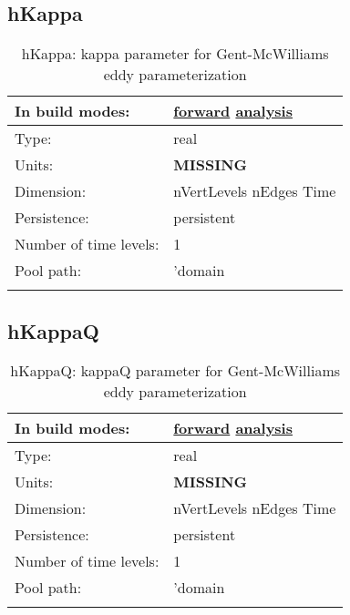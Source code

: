 \subsection[hKappa]{hKappa}
\label{subsec:var_sec_diagnostics_hKappa}
\begin{center}
\begin{longtable}{| p{2.0in} | p{4.0in} |}
        \hline 
        In build modes: & \hyperref[subsec:forward_var_tab_diagnostics]{forward} \hyperref[subsec:analysis_var_tab_diagnostics]{analysis} \\
        \hline 
        Type: & real \\
        \hline 
        Units: & {\bf \color{red} MISSING} \\
        \hline 
        Dimension: & nVertLevels nEdges Time \\
        \hline 
        Persistence: & persistent \\
        \hline 
        Number of time levels: & 1 \\
        \hline 
            Pool path: & 'domain %
 \\
		 \hline 
    \caption{hKappa: kappa parameter for Gent-McWilliams eddy parameterization}
\end{longtable}
\end{center}
\subsection[hKappaQ]{hKappaQ}
\label{subsec:var_sec_diagnostics_hKappaQ}
\begin{center}
\begin{longtable}{| p{2.0in} | p{4.0in} |}
        \hline 
        In build modes: & \hyperref[subsec:forward_var_tab_diagnostics]{forward} \hyperref[subsec:analysis_var_tab_diagnostics]{analysis} \\
        \hline 
        Type: & real \\
        \hline 
        Units: & {\bf \color{red} MISSING} \\
        \hline 
        Dimension: & nVertLevels nEdges Time \\
        \hline 
        Persistence: & persistent \\
        \hline 
        Number of time levels: & 1 \\
        \hline 
            Pool path: & 'domain %
 \\
		 \hline 
    \caption{hKappaQ: kappaQ parameter for Gent-McWilliams eddy parameterization}
\end{longtable}
\end{center}
